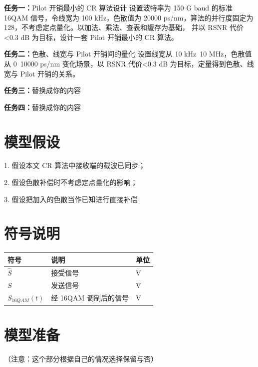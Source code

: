 \documentclass[a4paper,10pt]{my_paper}
\numberwithin{equation}{section}
\begin{document}
\textbf{任务一：}Pilot 开销最小的 CR 算法设计
设置波特率为 150 G baud 的标准 16QAM 信号，令线宽为 100 kHz，色散值为 20000
ps/nm，算法的并行度固定为 128，不考虑定点量化。以加法、乘法、查表和缓存为基础，
并以 RSNR 代价<0.3 dB 为目标，设计一套 Pilot 开销最小的 CR 算法。

\textbf{任务二：}色散、线宽与 Pilot 开销间的量化
设置线宽从 10 kHz~10 MHz，色散值从 0~10000 ps/nm 变化场景，以 RSNR 代价<0.3
dB 为目标，定量得到色散、线宽与 Pilot 开销的关系。

\textbf{任务三：}替换成你的内容

\textbf{任务四：}替换成你的内容
\section{模型假设}
1. 假设本文 CR 算法中接收端的载波已同步；

2. 假设色散补偿时不考虑定点量化的影响；

3. 假设把加入的色散当作已知进行直接补偿

\section{符号说明}



\begin{table}[htb]
    \centering
    \begin{tabular}{p{2.0cm}<{\centering}p{9.0cm}<{\centering}p{2.0cm}<{\centering}}
    \hline
    符号 & 说明 & 单位 \\ %
    \hline
    $\hat{S}$ & 接受信号 & V \\ %
    $S$ & 发送信号 & V \\ 
    $S_{16QAM}(t)$ &  经 16QAM 调制后的信号 &  V \\ 
    \hline
    \end{tabular}
\end{table}

\section{模型准备}
（注意：这个部分根据自己的情况选择保留与否）
\end{document}
